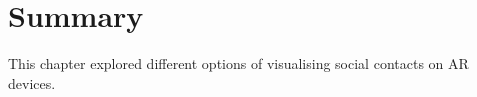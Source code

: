 \section{Summary}

This chapter explored different options of visualising social contacts on AR devices.

